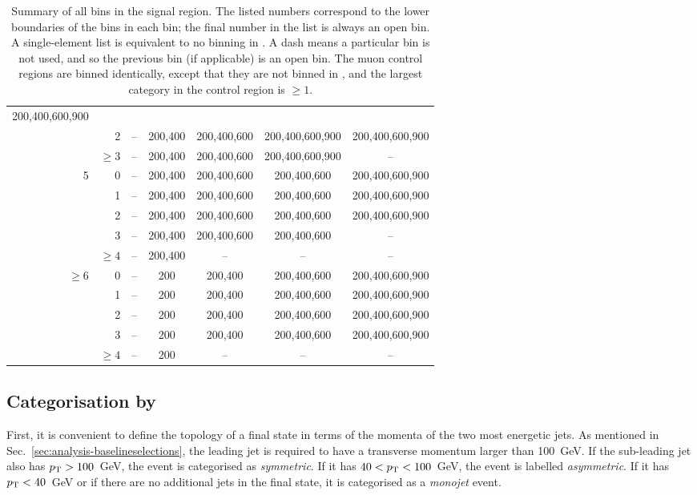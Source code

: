 \begin{table}[h!]
\begin{tabular}{r|r|ccccc}
         200,400,600,900 \\
         &      2 & -- & 200,400 & 200,400,600 & 200,400,600,900 & 
         200,400,600,900 \\
         & $\ge3$ & -- & 200,400 & 200,400,600 & 200,400,600,900 & -- \\
\hline
       5 &      0 & -- & 200,400 & 200,400,600 & 200,400,600 & 200,400,600,900 
       \\
         &      1 & -- & 200,400 & 200,400,600 & 200,400,600 & 200,400,600,900 
         \\
         &      2 & -- & 200,400 & 200,400,600 & 200,400,600 & 200,400,600,900 
         \\
         &      3 & -- & 200,400 & 200,400,600 & 200,400,600 & -- \\
         & $\ge4$ & -- & 200,400 & -- & -- & -- \\
\hline
  $\ge6$ &      0 & -- & 200       & 200,400 & 200,400,600 & 200,400,600,900 \\
         &      1 & -- & 200       & 200,400 & 200,400,600 & 200,400,600,900 \\
         &      2 & -- & 200       & 200,400 & 200,400,600 & 200,400,600,900 \\
         &      3 & -- & 200       & 200,400 & 200,400,600 & 200,400,600,900 \\
         & $\ge4$ & -- & 200       & -- & -- & -- \\
\hline
\end{tabular}
\caption{Summary of all bins in the signal region. The listed numbers 
correspond to the lower boundaries of the \mht bins in each \njnbht bin; the 
final number in the list is always an open bin. A single-element list is 
equivalent to no binning in \mht. 
A dash means a particular \njnbht bin is not used, and so the previous \scalht 
bin (if applicable) is an open bin.
The muon control regions are binned identically, except that they are not 
binned in \mht, and the largest \nb category in the 
\mmj control region is $\ge1$.}
\label{tab:binning}
\end{table}

\subsection*{Categorisation by \njet}

First, it is convenient to define the topology of a final state in terms of the 
momenta of the two most energetic jets. 
As mentioned in Sec.~\ref{sec:analysis-baselineselections}, the leading jet is 
required to have a transverse momentum larger than 100~GeV. 
If the sub-leading jet also has ${p_{\text T}}>100$~GeV, the event is categorised as
\textit{symmetric}. If it has $40<{p_{\text T}}<100$~GeV, the event is labelled 
\textit{asymmetric}. If it has ${p_{\text T}}<40$~GeV or if there are no additional jets 
in the final state, it is categorised as a \textit{monojet} event. 

